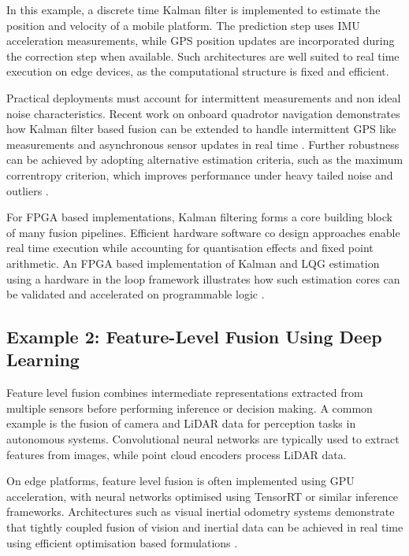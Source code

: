 \documentclass[journal]{IEEEtran}
\begin{document}
In this example, a discrete time Kalman filter is implemented to estimate the position and velocity of a mobile platform. The prediction step uses IMU acceleration measurements, while GPS position updates are incorporated during the correction step when available. Such architectures are well suited to real time execution on edge devices, as the computational structure is fixed and efficient.

Practical deployments must account for intermittent measurements and non ideal noise characteristics. Recent work on onboard quadrotor navigation demonstrates how Kalman filter based fusion can be extended to handle intermittent GPS like measurements and asynchronous sensor updates in real time \cite{xatziloizou_indoors_2022}. Further robustness can be achieved by adopting alternative estimation criteria, such as the maximum correntropy criterion, which improves performance under heavy tailed noise and outliers \cite{xatziloizou_maximum_2023}.

For FPGA based implementations, Kalman filtering forms a core building block of many fusion pipelines. Efficient hardware software co design approaches enable real time execution while accounting for quantisation effects and fixed point arithmetic. An FPGA based implementation of Kalman and LQG estimation using a hardware in the loop framework illustrates how such estimation cores can be validated and accelerated on programmable logic \cite{deliparaschos_fpgabased_2016}.

\subsection{Example 2: Feature-Level Fusion Using Deep Learning}

Feature level fusion combines intermediate representations extracted from multiple sensors before performing inference or decision making. A common example is the fusion of camera and LiDAR data for perception tasks in autonomous systems. Convolutional neural networks are typically used to extract features from images, while point cloud encoders process LiDAR data.

On edge platforms, feature level fusion is often implemented using GPU acceleration, with neural networks optimised using TensorRT or similar inference frameworks. Architectures such as visual inertial odometry systems demonstrate that tightly coupled fusion of vision and inertial data can be achieved in real time using efficient optimisation based formulations \cite{mourikis_multistate_2007, leutenegger_keyframe_2015}.
\end{document}
